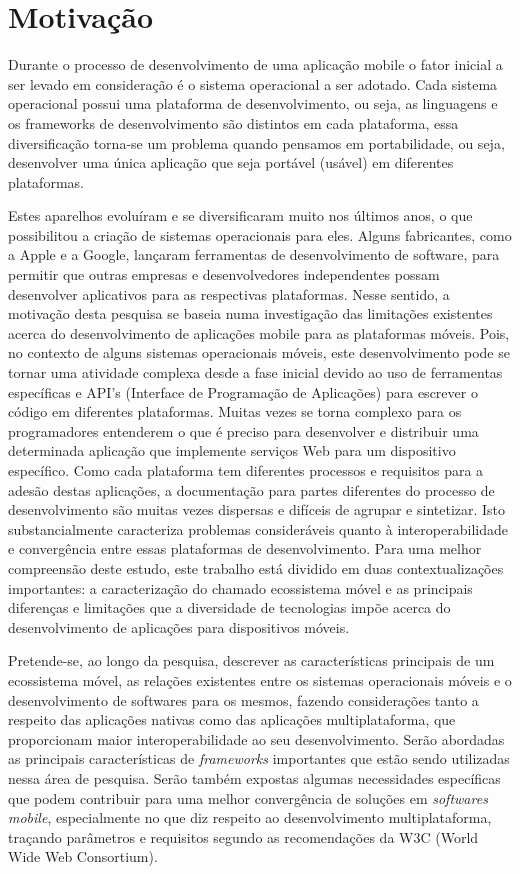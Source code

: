 \section{Motivação}
\label{sec:motivacao}

Durante o processo de desenvolvimento de uma aplicação mobile o
fator inicial a ser levado em consideração é o sistema operacional a ser adotado.
Cada sistema operacional possui uma plataforma de desenvolvimento, ou seja, as
linguagens e os frameworks de desenvolvimento são distintos em cada plataforma,
essa diversificação torna-se um problema quando pensamos em portabilidade,
ou seja, desenvolver uma única aplicação que seja portável (usável) em
diferentes plataformas.

Estes aparelhos evoluíram e se diversificaram muito nos últimos anos, o que possibilitou a criação de
sistemas operacionais para eles. Alguns fabricantes, como a Apple e a Google, lançaram
ferramentas de desenvolvimento de software, para permitir que outras empresas e desenvolvedores
independentes possam desenvolver aplicativos para as respectivas plataformas.
Nesse sentido, a motivação desta pesquisa se baseia numa investigação das limitações existentes
acerca do desenvolvimento de aplicações mobile para as plataformas móveis. Pois, no contexto de alguns
sistemas operacionais móveis, este desenvolvimento pode se tornar uma atividade complexa desde a fase
inicial devido ao uso de ferramentas específicas e API’s (Interface de Programação de Aplicações) para
escrever o código em diferentes plataformas. Muitas vezes se torna complexo para os programadores
entenderem o que é preciso para desenvolver e distribuir uma determinada aplicação que implemente
serviços Web para um dispositivo específico. Como cada plataforma tem diferentes processos e requisitos
para a adesão destas aplicações, a documentação para partes diferentes do processo de desenvolvimento são
muitas vezes dispersas e difíceis de agrupar e sintetizar. Isto substancialmente caracteriza problemas
consideráveis quanto à interoperabilidade e convergência entre essas plataformas de desenvolvimento. Para
uma melhor compreensão deste estudo, este trabalho está dividido em duas contextualizações importantes: a
caracterização do chamado ecossistema móvel e as principais diferenças e limitações que a diversidade de
tecnologias impõe acerca do desenvolvimento de aplicações para dispositivos móveis.

Pretende-se, ao longo da pesquisa, descrever as características principais de um ecossistema móvel, as
relações existentes entre os sistemas operacionais móveis e o desenvolvimento de softwares para os
mesmos, fazendo considerações tanto a respeito das aplicações nativas como das aplicações
multiplataforma, que proporcionam maior interoperabilidade ao seu desenvolvimento. 
Serão abordadas as principais características de \textit{frameworks} importantes que estão sendo
utilizadas nessa área de pesquisa. Serão também expostas algumas necessidades específicas que
podem contribuir para uma melhor convergência de soluções em \textit{softwares mobile}, especialmente no que diz
respeito ao desenvolvimento multiplataforma, traçando parâmetros e requisitos segundo as recomendações
da W3C (World Wide Web Consortium).

